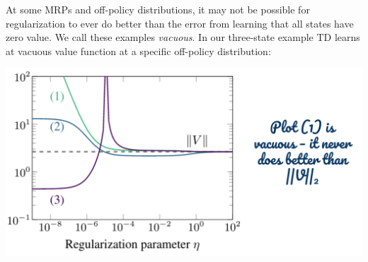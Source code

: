 At some MRPs and off-policy distributions, it may not be possible for regularization to ever do better than the error from learning that all states have zero value. We call these examples \emph{vacuous}.
In our three-state example TD learns at vacuous value function at a specific off-policy distribution:
\begin{center}
    \includegraphics[scale=0.4]{parts/vacuous/vacuousactual.png}
\end{center}
\vspace{-.5in}
